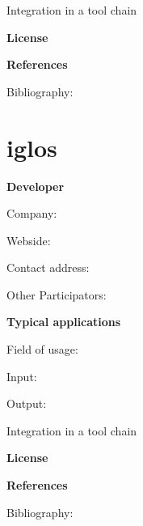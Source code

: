 \documentclass{./template/openetcs_report}
\begin{document}



	Integration in a tool chain



	\textbf{License}


	\textbf{References}

	Bibliography:


\section{iglos}

	\textbf{Developer}

	Company: 

	Webside:

	Contact address:

	Other  Participators:



	\textbf{Typical applications}

	Field of usage:


	Input:

	Output:





	Integration in a tool chain



	\textbf{License}


	\textbf{References}

	Bibliography:
\end{document}
